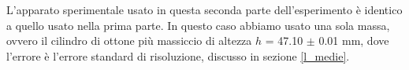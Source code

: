 L'apparato sperimentale usato in questa seconda parte dell'esperimento è
identico a quello usato nella prima parte. In questo caso abbiamo usato una sola massa,
ovvero il cilindro di ottone più massiccio di altezza $h$ = 47.10 $\pm$ 0.01 mm,
dove l'errore è l'errore standard di risoluzione, discusso in sezione \ref{l_medie}.
